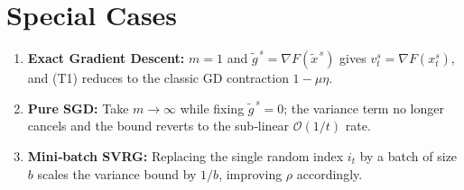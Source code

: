 \documentclass{article}
\begin{document}
\section*{Special Cases}
\begin{enumerate}
\item \textbf{Exact Gradient Descent:} $m=1$ and $\tilde{g}^{\,s}= \nabla F(\tilde{x}^{\,s})$ gives $v_t^{s}= \nabla F(x_{t}^{s})$, and (T1) reduces to the classic GD contraction $1-\mu\eta$.
\item \textbf{Pure SGD:} Take $m\to\infty$ while fixing $\tilde{g}^{\,s}=0$; the variance term no longer cancels and the bound reverts to the sub‑linear $\mathcal{O}(1/t)$ rate.
\item \textbf{Mini‑batch SVRG:} Replacing the single random index $i_t$ by a batch of size $b$ scales the variance bound by $1/b$, improving $\rho$ accordingly.
\end{enumerate}
\end{document}
